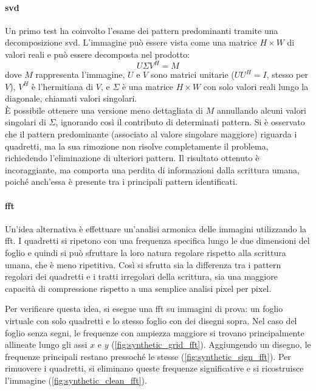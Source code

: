     \paragraph{\gls{svd}}
    Un primo test ha coinvolto l'esame dei pattern predominanti tramite una decomposizione \gls{svd}. L'immagine può essere vista come una matrice $H \times W$ di valori reali e può essere decomposta nel prodotto:
    \[
    U\Sigma V^H = M
    \]
    dove $M$ rappresenta l'immagine, $U$ e $V$ sono matrici unitarie ($UU^H = I$, stesso per $V$), $V^H$ è l'hermitiana di $V$, e $\Sigma$ è una matrice $H \times W$ con solo valori reali lungo la diagonale, chiamati valori singolari.\\
    È possibile ottenere una versione meno dettagliata di $M$ annullando alcuni valori singolari di $\Sigma$, ignorando così il contributo di determinati pattern. Si è osservato che il pattern predominante (associato al valore singolare maggiore) riguarda i quadretti, ma la sua rimozione non risolve completamente il problema, richiedendo l'eliminazione di ulteriori pattern. Il risultato ottenuto è incoraggiante, ma comporta una perdita di informazioni dalla scrittura umana, poiché anch'essa è presente tra i principali pattern identificati.

    \paragraph{\gls{fft}}
    Un'idea alternativa è effettuare un'analisi armonica delle immagini utilizzando la \gls{fft}. I quadretti si ripetono con una frequenza specifica lungo le due dimensioni del foglio e quindi si può sfruttare la loro natura regolare rispetto alla scrittura umana, che è meno ripetitiva. Così si sfrutta sia la differenza tra i pattern regolari dei quadretti e i tratti irregolari della scrittura, sia una maggiore capacità di compressione rispetto a una semplice analisi pixel per pixel.

    \noindent Per verificare questa idea, si esegue una \gls{fft} su immagini di prova: un foglio virtuale con solo quadretti e lo stesso foglio con dei disegni sopra. Nel caso del foglio senza segni, le frequenze con ampiezza maggiore si trovano principalmente allineate lungo gli assi $x$ e $y$ (\cref{fig:synthetic_grid_fft}). Aggiungendo un disegno, le frequenze principali restano pressoché le stesse (\cref{fig:synthetic_sign_fft}). Per rimuovere i quadretti, si eliminano queste frequenze significative e si ricostruisce l'immagine (\cref{fig:synthetic_clean_fft}).

